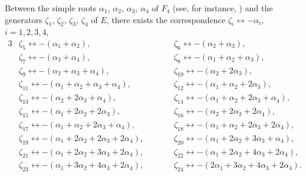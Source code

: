 \documentclass[pdftex]{sigma}
\numberwithin{equation}{section}
\theoremstyle{definition}
\newcommand{\0}{\boldsymbol{0}}
\begin{document}
\begin{Remark}\label{correspondence-generators-roots}
Between the simple roots $\alpha_1$, $\alpha_2$, $\alpha_3$, $\alpha_4$ of $F_4$ (see, for instance, \cite{Bourbaki}) and
the generators $\zeta_1$, $\zeta_2$, $\zeta_3$, $\zeta_4$ of $E$, there exists the correspondence
$\zeta_i \longleftrightarrow -\alpha_i$, $i = 1, 2, 3, 4$,
\begin{alignat*}{3}
&\zeta_5 \longleftrightarrow - (\alpha_1 + \alpha_2), \qquad&&
\zeta_6 \longleftrightarrow -(\alpha_2 + \alpha_3), & \\
&\zeta_7 \longleftrightarrow -(\alpha_3 + \alpha_4), \qquad&&
\zeta_8 \longleftrightarrow -(\alpha_1 + \alpha_2 + \alpha_3), \\
&\zeta_9 \longleftrightarrow -(\alpha_2 + \alpha_3 + \alpha_4), \qquad&&
\zeta_{10} \longleftrightarrow -(\alpha_2 + 2\alpha_3), \\
&\zeta_{11} \longleftrightarrow -(\alpha_1 + \alpha_2 + \alpha_3 + \alpha_4), \qquad&&
\zeta_{12} \longleftrightarrow -(\alpha_1 + \alpha_2 + 2\alpha_3), \\
&\zeta_{13} \longleftrightarrow -(\alpha_2 + 2\alpha_3 + \alpha_4), \qquad&&
\zeta_{14} \longleftrightarrow -(\alpha_1 + \alpha_2 + 2\alpha_3 + \alpha_4), \\
&\zeta_{15} \longleftrightarrow -(\alpha_1 + 2\alpha_2 + 2\alpha_3), \qquad&&
\zeta_{16} \longleftrightarrow -(\alpha_2 + 2\alpha_3 + 2\alpha_4), \\
&\zeta_{17} \longleftrightarrow -(\alpha_1 + \alpha_2 + 2\alpha_3 + \alpha_4), \qquad&&
\zeta_{18} \longleftrightarrow -(\alpha_1 + \alpha_2 + 2\alpha_3 + 2\alpha_4), \\
&\zeta_{19} \longleftrightarrow -(\alpha_1 + 2\alpha_2 + 2\alpha_3 + 2\alpha_4), \qquad&&
\zeta_{20} \longleftrightarrow -(\alpha_1 + 2\alpha_2 + 3\alpha_3 + \alpha_4), \\
&\zeta_{21} \longleftrightarrow -(\alpha_1 + 2\alpha_2 + 3\alpha_3 + 2\alpha_4), \qquad&&
\zeta_{22} \longleftrightarrow -(\alpha_1 + 2\alpha_2 + 4\alpha_3 + 2\alpha_4),\\
&\zeta_{23} \longleftrightarrow -(\alpha_1 + 3\alpha_2 + 4\alpha_3 + 2\alpha_4), \qquad&&
\zeta_{24} \longleftrightarrow -(2\alpha_1 + 3\alpha_2 + 4\alpha_3 + 2\alpha_4).
\end{alignat*}
\end{Remark}
\end{document}
